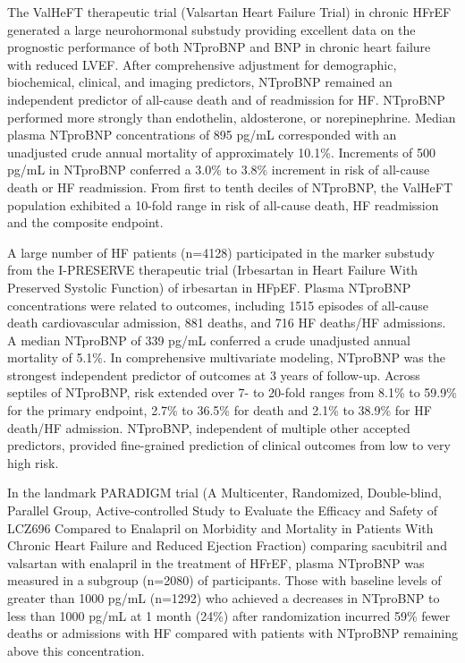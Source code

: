 \documentclass[14pt,a4paper,onecolumn]{extarticle}
\begin{document}
The ValHeFT therapeutic trial (Valsartan Heart Failure Trial) in chronic HFrEF generated a large neurohormonal substudy providing excellent data on the prognostic performance of both NTproBNP and BNP in chronic heart failure with reduced LVEF.  After comprehensive adjustment for demographic, biochemical, clinical, and imaging predictors, NTproBNP remained an independent predictor of all-cause death and of readmission for HF. NTproBNP performed more strongly than endothelin, aldosterone, or norepinephrine. Median plasma NTproBNP concentrations of 895 pg/mL corresponded with an unadjusted crude annual mortality of approximately 10.1\%. Increments of 500 pg/mL in NTproBNP conferred a 3.0\% to 3.8\% increment in risk of all-cause death or HF readmission. From first to tenth deciles of NTproBNP, the ValHeFT population exhibited a 10-fold range in risk of all-cause death, HF readmission and the composite endpoint. \citep{bib3204}

A large number of HF patients (n=4128) participated in the marker substudy from the I-PRESERVE therapeutic trial (Irbesartan in Heart Failure With Preserved Systolic Function) of irbesartan in HFpEF. Plasma NTproBNP concentrations were related to outcomes, including 1515 episodes of all-cause death cardiovascular admission, 881 deaths, and 716 HF deaths/HF admissions. A median NTproBNP of 339 pg/mL conferred a crude unadjusted annual mortality of 5.1\%. In comprehensive multivariate modeling, NTproBNP was the strongest independent predictor of outcomes at 3 years of follow-up. Across septiles of NTproBNP, risk extended over 7- to 20-fold ranges from 8.1\% to 59.9\% for the primary endpoint, 2.7\% to 36.5\% for death and 2.1\% to 38.9\% for HF death/HF admission. NTproBNP, independent of multiple other accepted predictors, provided fine-grained prediction of clinical outcomes from low to very high risk. \citep{Komajda2011}

In the landmark PARADIGM trial (A Multicenter, Randomized, Double-blind, Parallel Group, Active-controlled Study to Evaluate the Efficacy and Safety of LCZ696 Compared to Enalapril on Morbidity and Mortality in Patients With Chronic Heart Failure and Reduced Ejection Fraction) comparing sacubitril and valsartan with enalapril in the treatment of HFrEF, plasma NTproBNP was measured in a subgroup (n=2080) of participants.  Those with baseline levels of greater than 1000 pg/mL (n=1292) who achieved a decreases in NTproBNP to less than 1000 pg/mL at 1 month (24\%) after randomization incurred 59\% fewer deaths or admissions with HF compared with patients with NTproBNP remaining above this concentration. \citep{Zile2016}
\end{document}
